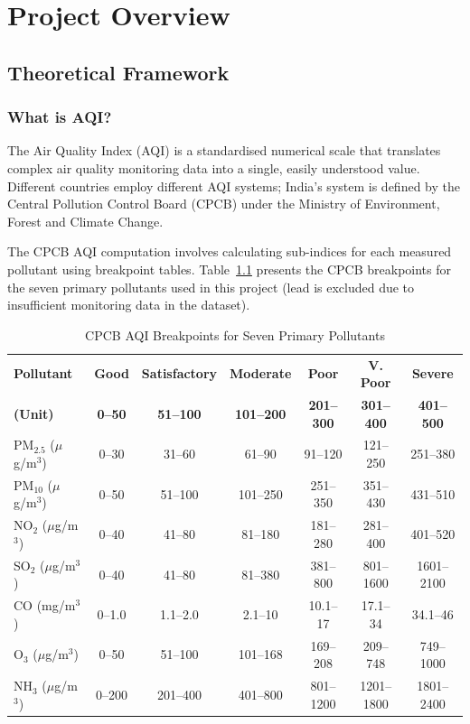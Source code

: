 \documentclass[12pt,a4paper]{report}
\begin{document}
\clearpage
\chapter{Project Overview}\label{idx:ch2}

\section{Theoretical Framework}\label{idx:s21}

\subsection{What is AQI?}

The Air Quality Index (AQI) is a standardised numerical scale that translates complex air quality monitoring data into a single, easily understood value. Different countries employ different AQI systems; India's system is defined by the Central Pollution Control Board (CPCB) under the Ministry of Environment, Forest and Climate Change.

The CPCB AQI computation involves calculating sub-indices for each measured pollutant using breakpoint tables. Table~\ref{tab:cpcb_breakpoints} presents the CPCB breakpoints for the seven primary pollutants used in this project (lead is excluded due to insufficient monitoring data in the dataset).

\begin{table}[H]
\centering
\caption{CPCB AQI Breakpoints for Seven Primary Pollutants}
\label{tab:cpcb_breakpoints}
\small
\begin{tabular}{|l|c|c|c|c|c|c|}
\hline
\textbf{Pollutant} & \textbf{Good} & \textbf{Satisfactory} & \textbf{Moderate} & \textbf{Poor} & \textbf{V. Poor} & \textbf{Severe} \\
\textbf{(Unit)} & \textbf{0--50} & \textbf{51--100} & \textbf{101--200} & \textbf{201--300} & \textbf{301--400} & \textbf{401--500} \\
\hline
PM$_{2.5}$ ($\mu$g/m$^3$) & 0--30 & 31--60 & 61--90 & 91--120 & 121--250 & 251--380 \\
\hline
PM$_{10}$ ($\mu$g/m$^3$) & 0--50 & 51--100 & 101--250 & 251--350 & 351--430 & 431--510 \\
\hline
NO$_2$ ($\mu$g/m$^3$) & 0--40 & 41--80 & 81--180 & 181--280 & 281--400 & 401--520 \\
\hline
SO$_2$ ($\mu$g/m$^3$) & 0--40 & 41--80 & 81--380 & 381--800 & 801--1600 & 1601--2100 \\
\hline
CO (mg/m$^3$) & 0--1.0 & 1.1--2.0 & 2.1--10 & 10.1--17 & 17.1--34 & 34.1--46 \\
\hline
O$_3$ ($\mu$g/m$^3$) & 0--50 & 51--100 & 101--168 & 169--208 & 209--748 & 749--1000 \\
\hline
NH$_3$ ($\mu$g/m$^3$) & 0--200 & 201--400 & 401--800 & 801--1200 & 1201--1800 & 1801--2400 \\
\hline
\end{tabular}
\end{table}
\end{document}
